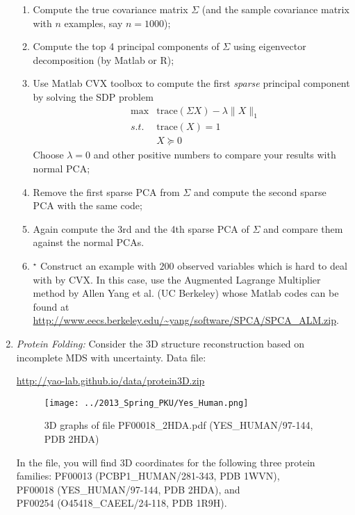 \documentclass[11pt]{article}
\def\tr{{\mathrm{trace}}}
\begin{document}
\begin{enumerate}
\begin{enumerate}
\item Compute the true covariance matrix $\Sigma$ (and the sample covariance matrix with $n$ examples, say $n=1000$);
\item Compute the top 4 principal components of $\Sigma$ using eigenvector decomposition (by Matlab or R);
\item Use Matlab CVX toolbox to compute the first \emph{sparse} principal component by solving the SDP problem
\begin{eqnarray*}
& \max & \tr (\Sigma X) - \lambda \|X\|_1 \\
 & s.t. & \tr (X) = 1 \\
 & & X \succeq 0
\end{eqnarray*}
Choose $\lambda =0$ and other positive numbers to compare your results with normal PCA;  

\item Remove the first sparse PCA from $\Sigma$ and compute the second sparse PCA with the same code;
\item Again compute the 3rd and the 4th sparse PCA of $\Sigma$ and compare them against the normal PCAs.  
\item $^\star$ Construct an example with $200$ observed variables which is hard to deal with by CVX. 
In this case, use the Augmented Lagrange Multiplier method by Allen Yang et al. (UC Berkeley) whose Matlab codes can be found at 
\url{http://www.eecs.berkeley.edu/~yang/software/SPCA/SPCA_ALM.zip}. 
\end{enumerate}

\item{\em Protein Folding:} Consider the 3D structure reconstruction based on incomplete MDS with uncertainty. Data file: 

\url{http://yao-lab.github.io/data/protein3D.zip}

\begin{figure}[htbp]
\begin{center}
\texttt{[image: ../2013\_Spring\_PKU/Yes\_Human.png]}  
\caption{3D graphs of file PF00018\_2HDA.pdf (YES\_HUMAN/97-144, PDB 2HDA)}
\label{yes_human}
\end{center}
\end{figure}

\noindent In the file, you will find 3D coordinates for the following three protein families: 
\subitem PF00013 (PCBP1\_HUMAN/281-343, PDB 1WVN), \\
\subitem PF00018 (YES\_HUMAN/97-144, PDB 2HDA), and \\
\subitem PF00254 (O45418\_CAEEL/24-118, PDB 1R9H). \\


\end{enumerate}
\end{document}
